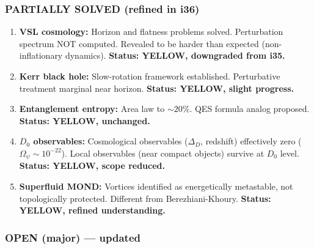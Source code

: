 \documentclass[11pt,a4paper]{article}
\newcommand{\YELLOW}{\textcolor{dfdyellow}{\textbf{YELLOW}}}
\begin{document}
\subsubsection{PARTIALLY SOLVED (refined in i36)}

\begin{enumerate}
\item \textbf{VSL cosmology:} Horizon and flatness problems solved. Perturbation spectrum NOT computed. Revealed to be harder than expected (non-inflationary dynamics). \textbf{Status: \YELLOW, downgraded from i35.}

\item \textbf{Kerr black hole:} Slow-rotation framework established. Perturbative treatment marginal near horizon. \textbf{Status: \YELLOW, slight progress.}

\item \textbf{Entanglement entropy:} Area law to $\sim 20\%$. QES formula analog proposed. \textbf{Status: \YELLOW, unchanged.}

\item \textbf{$D_0$ observables:} Cosmological observables ($\Delta_D$, redshift) effectively zero ($\Omega_\psi \sim 10^{-22}$). Local observables (near compact objects) survive at $D_0$ level. \textbf{Status: \YELLOW, scope reduced.}

\item \textbf{Superfluid MOND:} Vortices identified as energetically metastable, not topologically protected. Different from Berezhiani-Khoury. \textbf{Status: \YELLOW, refined understanding.}
\end{enumerate}

\subsubsection{OPEN (major) --- updated}
\end{document}
